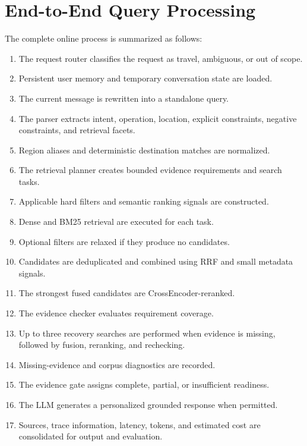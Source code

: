 \section{End-to-End Query Processing}

The complete online process is summarized as follows:

\begin{enumerate}
    \item The request router classifies the request as travel, ambiguous, or out
    of scope.
    \item Persistent user memory and temporary conversation state are loaded.
    \item The current message is rewritten into a standalone query.
    \item The parser extracts intent, operation, location, explicit constraints,
    negative constraints, and retrieval facets.
    \item Region aliases and deterministic destination matches are normalized.
    \item The retrieval planner creates bounded evidence requirements and search
    tasks.
    \item Applicable hard filters and semantic ranking signals are constructed.
    \item Dense and BM25 retrieval are executed for each task.
    \item Optional filters are relaxed if they produce no candidates.
    \item Candidates are deduplicated and combined using RRF and small metadata
    signals.
    \item The strongest fused candidates are CrossEncoder-reranked.
    \item The evidence checker evaluates requirement coverage.
    \item Up to three recovery searches are performed when evidence is missing,
    followed by fusion, reranking, and rechecking.
    \item Missing-evidence and corpus diagnostics are recorded.
    \item The evidence gate assigns complete, partial, or insufficient
    readiness.
    \item The LLM generates a personalized grounded response when permitted.
    \item Sources, trace information, latency, tokens, and estimated cost are
    consolidated for output and evaluation.
\end{enumerate}

